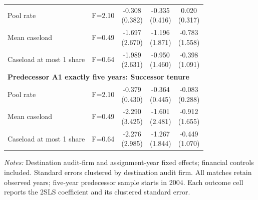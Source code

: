 \documentclass[10pt]{article}
\begin{document}
\begin{minipage}{19cm}
\begin{threeparttable}
\begin{tabular}{p{}cccc}
Pool rate & F=2.10 & \shortstack{-0.308\\(0.382)} & \shortstack{-0.335\\(0.416)} & \shortstack{0.020\\(0.317)} \\
Mean caseload & F=0.49 & \shortstack{-1.697\\(2.670)} & \shortstack{-1.196\\(1.871)} & \shortstack{-0.783\\(1.558)} \\
Caseload at most 1 share & F=0.64 & \shortstack{-1.989\\(2.631)} & \shortstack{-0.950\\(1.460)} & \shortstack{-0.398\\(1.091)} \\
\multicolumn{5}{l}{\textbf{Predecessor A1 exactly five years: Successor tenure}} \\
Pool rate & F=2.10 & \shortstack{-0.379\\(0.430)} & \shortstack{-0.364\\(0.445)} & \shortstack{-0.083\\(0.288)} \\
Mean caseload & F=0.49 & \shortstack{-2.290\\(3.425)} & \shortstack{-1.601\\(2.481)} & \shortstack{-0.912\\(1.655)} \\
Caseload at most 1 share & F=0.64 & \shortstack{-2.276\\(2.985)} & \shortstack{-1.267\\(1.844)} & \shortstack{-0.449\\(1.070)} \\
\bottomrule
\end{tabular}
\begin{tablenotes}\fontsize{9}{11}\selectfont
\item \raggedright \fontsize{9}{11}\selectfont \textit{Notes:} Destination audit-firm and assignment-year fixed effects; financial controls included. Standard errors clustered by destination audit firm. All matches retain observed years; five-year predecessor sample starts in 2004. Each outcome cell reports the 2SLS coefficient and its clustered standard error.
\end{tablenotes}
\end{threeparttable}

\end{minipage}
\end{document}
